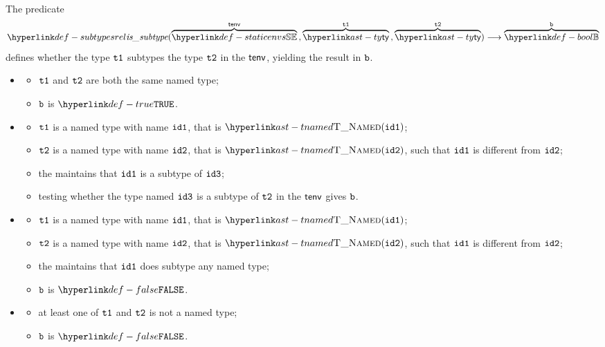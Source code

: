 
\hypertarget{def-subtypesrel}{}
The predicate
\[
  \subtypesrel(\overname{\staticenvs}{\tenv} \aslsep \overname{\ty}{\vtone} \aslsep \overname{\ty}{\vttwo})
  \aslto \overname{\Bool}{\vb}
\]
defines whether the type $\texttt{t1}$ subtypes the type $\texttt{t2}$ in the \staticenvironmentterm{} $\textsf{tenv}$,
yielding the result in $\texttt{b}$.

\ProseParagraph
\OneApplies
\begin{itemize}
  \item {}
  \begin{itemize}
    \item $\texttt{t1}$ and $\texttt{t2}$ are both the same named type;
    \item $\texttt{b}$ is $\True$.
  \end{itemize}

  \item {}
  \begin{itemize}
    \item $\texttt{t1}$ is a named type with name $\texttt{id1}$, that is $\TNamed(\idone)$;
    \item $\texttt{t2}$ is a named type with name $\texttt{id2}$, that is $\TNamed(\idtwo)$, such that $\texttt{id1}$ is different from $\texttt{id2}$;
    \item the \globalstaticenvironmentterm{} maintains that $\texttt{id1}$ is a subtype of $\texttt{id3}$;
    \item testing whether the type named $\texttt{id3}$ is a subtype of $\texttt{t2}$ in the \staticenvironmentterm{} $\textsf{tenv}$
    gives $\texttt{b}$.
  \end{itemize}

  \item {}
  \begin{itemize}
    \item $\texttt{t1}$ is a named type with name $\texttt{id1}$, that is $\TNamed(\idone)$;
    \item $\texttt{t2}$ is a named type with name $\texttt{id2}$, that is $\TNamed(\idtwo)$, such that $\texttt{id1}$ is different from $\texttt{id2}$;
    \item the \globalstaticenvironmentterm{} maintains that $\texttt{id1}$ does subtype any named type;
    \item $\texttt{b}$ is $\False$.
  \end{itemize}

  \item {}
  \begin{itemize}
    \item at least one of $\texttt{t1}$ and $\texttt{t2}$ is not a named type;
    \item $\texttt{b}$ is $\False$.
  \end{itemize}
\end{itemize}

